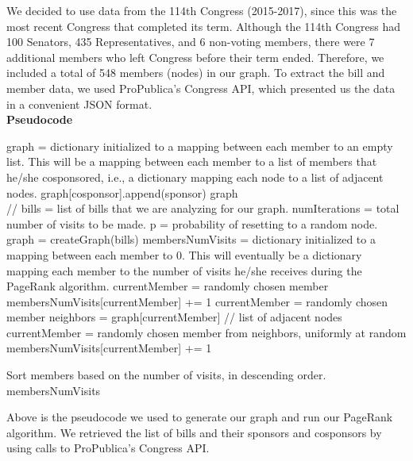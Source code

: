\documentclass[11pt]{article}
\begin{document}
We decided to use data from the 114th Congress (2015-2017), since this was the most recent Congress that completed its term. Although the 114th Congress had 100 Senators, 435 Representatives, and 6 non-voting members, there were 7 additional members who left Congress before their term ended. Therefore, we included a total of 548 members (nodes) in our graph. To extract the bill and member data, we used ProPublica's Congress API, which presented us the data in a convenient JSON format. \\





\textbf{Pseudocode}

\begin{algorithmic}[1]
\State graph = dictionary initialized to a mapping between each member to an empty list. This will be a mapping between each member to a list of members that he/she cosponsored, i.e., a dictionary mapping each node to a list of adjacent nodes. 
		\State graph[cosponsor].append(sponsor) 
	\EndFor 
\EndFor
\State \Return graph
\EndProcedure\\


 // bills = list of bills that we are analyzing for our graph. numIterations = total number of visits to be made. p = probability of resetting to a random node. 
\State graph = createGraph(bills) 
\State membersNumVisits = dictionary initialized to a mapping between each member to 0. This will eventually be a dictionary mapping each member to the number of visits he/she receives during the PageRank algorithm. 
\State currentMember = randomly chosen member
\State membersNumVisits[currentMember] += 1
		\State currentMember = randomly chosen member
	\Else
		\State neighbors = graph[currentMember] // list of adjacent nodes
		\State currentMember = randomly chosen member from neighbors, uniformly at random
	\EndIf
	\State membersNumVisits[currentMember] += 1

\EndFor
\State Sort members based on the number of visits, in descending order. 
\State \Return membersNumVisits
\EndProcedure
\end{algorithmic}

Above is the pseudocode we used to generate our graph and run our PageRank algorithm. We retrieved the list of bills and their sponsors and cosponsors by using calls to ProPublica's Congress API. 
\end{document}

